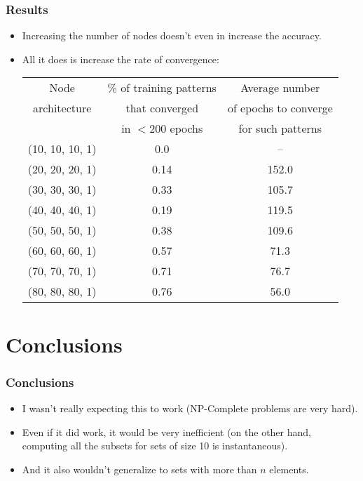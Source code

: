 \documentclass{beamer}
\numberwithin{equation}{section} %
\begin{document}
\begin{frame}
    \frametitle{Results}
    \begin{itemize}
        \item Increasing the number of nodes doesn't even in increase the accuracy.
        \pause
        \item All it does is increase the rate of convergence:\\
        \footnotesize
        \begin{tabular}{|c|c|c|}
            \hline
            Node & \% of training patterns & Average number \\
            architecture &  that converged & of epochs to converge\\
             & in $< 200$ epochs &  for such patterns\\
            \hline
            (10, 10, 10, 1) & 0.0 & --\\
            \hline
            (20, 20, 20, 1) & 0.14 & 152.0\\
            \hline
            (30, 30, 30, 1) & 0.33 & 105.7\\
            \hline
            (40, 40, 40, 1) & 0.19 & 119.5\\
            \hline
            (50, 50, 50, 1) & 0.38 & 109.6\\
            \hline
            (60, 60, 60, 1) & 0.57 & 71.3\\
            \hline
            (70, 70, 70, 1) & 0.71 & 76.7\\
            \hline
            (80, 80, 80, 1) & 0.76 & 56.0\\
            \hline
        \end{tabular}
        \normalsize
    \end{itemize}
\end{frame}

\section{Conclusions}

\begin{frame}
    \frametitle{Conclusions}
    \begin{itemize}
        \item I wasn't really expecting this to work (NP-Complete problems are very hard).
        \pause
        \item Even if it did work, it would be very inefficient (on the other hand, computing all the subsets for sets of size 10 is instantaneous).
        \pause
        \item And it also wouldn't generalize to sets with more than $n$ elements.
    \end{itemize}
\end{frame}
\end{document}
